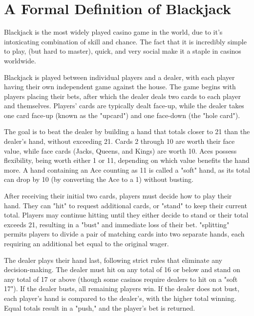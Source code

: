\documentclass[10pt]{article}
\theoremstyle{definition}
\begin{document}
\section{A Formal Definition of Blackjack}
Blackjack is the most widely played casino game in the world, due to it's intoxicating combination of skill and chance.
The fact that it is incredibly simple to play, (but hard to master), quick, and very social make it a staple in casinos worldwide.

Blackjack is played between individual players and a dealer, with each player having their own independent game against the house. 
The game begins with players placing their bets, after which the dealer deals two cards to each player and themselves. 
Players' cards are typically dealt face-up, while the dealer takes one card face-up (known as the "upcard") and one face-down (the "hole card").

The goal is to beat the dealer by building a hand that totals closer to 21 than the dealer's hand, without exceeding 21. 
Cards 2 through 10 are worth their face value, while face cards (Jacks, Queens, and Kings) are worth 10. 
Aces possess flexibility, being worth either 1 or 11, depending on which value benefits the hand more. 
A hand containing an Ace counting as 11 is called a "soft" hand, as its total can drop by 10 (by converting the Ace to a 1) without busting.

After receiving their initial two cards, players must decide how to play their hand. 
They can "hit" to request additional cards, or "stand" to keep their current total. 
Players may continue hitting until they either decide to stand or their total exceeds 21, resulting in a "bust" and immediate loss of their bet. 
"splitting" permits players to divide a pair of matching cards into two separate hands, each requiring an additional bet equal to the original wager.

The dealer plays their hand last, following strict rules that eliminate any decision-making. 
The dealer must hit on any total of 16 or below and stand on any total of 17 or above (though some casinos require dealers to hit on a "soft 17").
If the dealer busts, all remaining players win. 
If the dealer does not bust, each player's hand is compared to the dealer's, with the higher total winning. 
Equal totals result in a "push," and the player's bet is returned.
\end{document}
